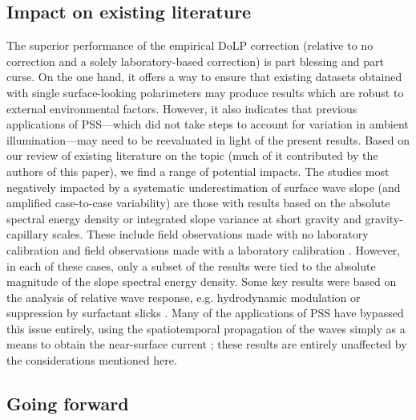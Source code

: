 \documentclass[letterpaper,journal]{IEEEtran}
\begin{document}

\subsection{Impact on existing literature}

The superior performance of the empirical DoLP correction (relative to no correction and a solely laboratory-based correction) is part blessing and part curse. On the one hand, it offers a way to ensure that existing datasets obtained with single surface-looking polarimeters may produce results which are robust to external environmental factors. However, it also indicates that previous applications of PSS---which did not take steps to account for variation in ambient illumination---may need to be reevaluated in light of the present results. Based on our review of existing literature on the topic (much of it contributed by the authors of this paper), we find a range of potential impacts. The studies most negatively impacted by a systematic underestimation of surface wave slope (and amplified case-to-case variability) are those with results based on the absolute spectral energy density or integrated slope variance at short gravity and gravity-capillary scales. These include field observations made with no laboratory calibration \cite{Laxague2015} and field observations made with a laboratory calibration \cite{Zappa2012,Laxague2018b}. However, in each of these cases, only a subset of the results were tied to the absolute magnitude of the slope spectral energy density. Some key results were based on the analysis of relative wave response, e.g. hydrodynamic modulation \cite{Laxague2017a} or suppression by surfactant slicks \cite{laxague_suppression_2024}. Many of the applications of PSS have bypassed this issue entirely, using the spatiotemporal propagation of the waves simply as a means to obtain the near-surface current \cite{laxague2017b,Laxague2018a,Laxague2020a,Laxague2020b}; these results are entirely unaffected by the considerations mentioned here.

\subsection{Going forward}
\label{sec:forward}
\end{document}
